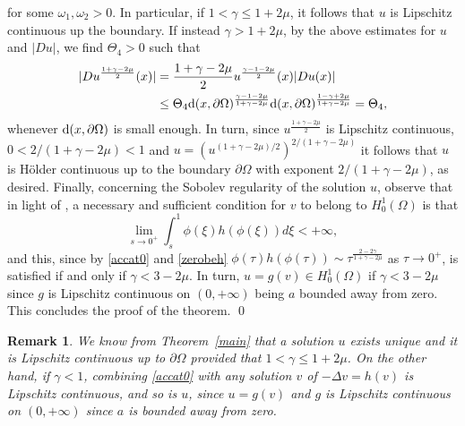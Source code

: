 \documentclass[10pt]{amsart}
\numberwithin{equation}{section}
\newtheorem{remark}[theorem]{Remark}
\theoremstyle{definition}
\begin{document}
for some $\omega_1,\omega_2>0$. In particular, if $1<\gamma\leq 1+2\mu$, it follows that $u$
is Lipschitz continuous up the boundary. If instead $\gamma>1+2\mu$,
by the above estimates for $u$ and $|Du|$, we find $\Theta_4>0$ such that
\begin{align*}
|D u^{\frac{1+\gamma-2\mu}{2}}(x)|& =\frac{1+\gamma-2\mu}{2}u^\frac{\gamma-1-2\mu}{2}(x)|Du(x)| \\
& \leq \Theta_4 {\rm d}(x,\partial\Omega)^{{\frac{\gamma-1-2\mu}{1+\gamma-2\mu}}}{\rm d}(x,\partial\Omega)^{{\frac{1-\gamma+2\mu}{1+\gamma-2\mu}}}
=\Theta_4,
\end{align*}
whenever ${\rm d}(x,\partial\Omega)$ is small enough. In turn, since $u^{\frac{1+\gamma-2\mu}{2}}$
is Lipschitz continuous, $0<2/(1+\gamma-2\mu)<1$ and $u=(u^{(1+\gamma-2\mu)/2})^{2/(1+\gamma-2\mu)}$ it
follows that $u$ is H\"older continuous up to the boundary $\partial\Omega$ with exponent $2/(1+\gamma-2\mu)$,
as desired.
Finally, concerning the Sobolev regularity of the solution $u$, observe that in light of 
\cite[Theorem 1.3-J2]{zhangcheng}, a necessary and sufficient condition for
$v$ to belong to $H^1_0(\Omega)$ is that
$$
\lim_{s\to 0^+}\int_s^1 \phi(\xi)h(\phi(\xi))d\xi<+\infty,
$$
and this, since by \eqref{accat0} and \eqref{zerobeh} 
$ \phi(\tau)h(\phi(\tau))\sim \tau^{\frac{2-2\gamma}{1+\gamma-2\mu}}$ as $\tau\to 0^+$, is satisfied
if and only if $\gamma<3-2\mu$. In turn, $u=g(v)\in H^1_0(\Omega)$ if $\gamma<3-2\mu$ since
$g$ is Lipschitz continuous on $(0,+\infty)$ being $a$ bounded away from zero. This concludes the proof of the theorem. \qed

\begin{remark}\rm
	\label{lipremark}
We know from Theorem~\ref{main} that a solution $u$ exists unique and it is Lipschitz continuous up to $\partial\Omega$
provided that $1<\gamma\leq 1+2\mu$. On the other hand, if $\gamma<1$, combining \eqref{accat0} with \cite[Theorem 2.25]{craRabTar}
any solution $v$ of $-\Delta v=h(v)$ is Lipschitz continuous, and so is $u$, since $u=g(v)$ and $g$ is
Lipschitz continuous on $(0,+\infty)$ since $a$ is bounded away from zero.
\end{remark}
\end{document}
